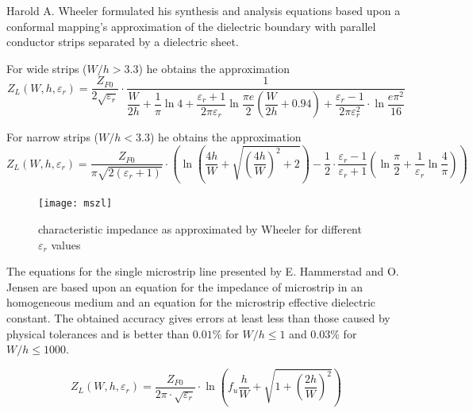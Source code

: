 \documentclass[10pt]{report}
\begin{document}
Harold A. Wheeler \cite{Wheeler2} formulated his synthesis and
analysis equations based upon a conformal mapping's approximation of
the dielectric boundary with parallel conductor strips separated by a
dielectric sheet.

\addvspace{12pt}

For wide strips ($W/h > 3.3$) he obtains the approximation
\begin{equation}
Z_{L}\left(W, h, \varepsilon_{r}\right) =
\frac{Z_{F0}}{2\sqrt{\varepsilon_{r}}}\cdot\frac{1}{\dfrac{W}{2h} + \dfrac{1}{\pi}\ln{4} + \dfrac{\varepsilon_{r} + 1}{2\pi \varepsilon_{r}} \ln{\dfrac{\pi e}{2}\left(\dfrac{W}{2h} + 0.94\right)} + \dfrac{\varepsilon_{r} - 1}{2\pi \varepsilon_{r}^{2}}\cdot \ln{\dfrac{e\pi^{2}}{16}}}
\end{equation}

For narrow strips ($W/h < 3.3$) he obtains the approximation
\begin{equation}
Z_{L}\left(W, h, \varepsilon_{r}\right) =
\frac{Z_{F0}}{\pi \sqrt{2 \left(\varepsilon_{r} + 1\right)}} \cdot \left(\ln{\left(\frac{4h}{W} + \sqrt{\left(\frac{4h}{W}\right)^{2} + 2}\right)} - \frac{1}{2}\cdot \frac{\varepsilon_{r} - 1}{\varepsilon_{r} + 1}\left(\ln{\frac{\pi}{2}} + \frac{1}{\varepsilon_{r}} \ln{\frac{4}{\pi}}\right)\right)
\end{equation}

\begin{figure}[ht]
\begin{center}
\texttt{[image: mszl]}
\end{center}
\caption{characteristic impedance as approximated by Wheeler for different $\varepsilon_{r}$ values}
\label{fig:mszl}
\end{figure}
\FloatBarrier

The equations for the single microstrip line presented by
E. Hammerstad and O. Jensen \cite{Hammerstad} are based upon an
equation for the impedance of microstrip in an homogeneous medium and
an equation for the microstrip effective dielectric constant.  The
obtained accuracy gives errors at least less than those caused by
physical tolerances and is better than $0.01\%$ for $W/h \le 1$ and
$0.03\%$ for $W/h \le 1000$.

\begin{equation}
Z_{L}\left(W, h, \varepsilon_{r}\right) =
\frac{Z_{F0}}{2\pi\cdot\sqrt{\varepsilon_{r}}}\cdot\ln{\left(f_{u}\frac{h}{W} + \sqrt{1 + \left(\frac{2h}{W}\right)^{2}}\right)}
\end{equation}
\end{document}
